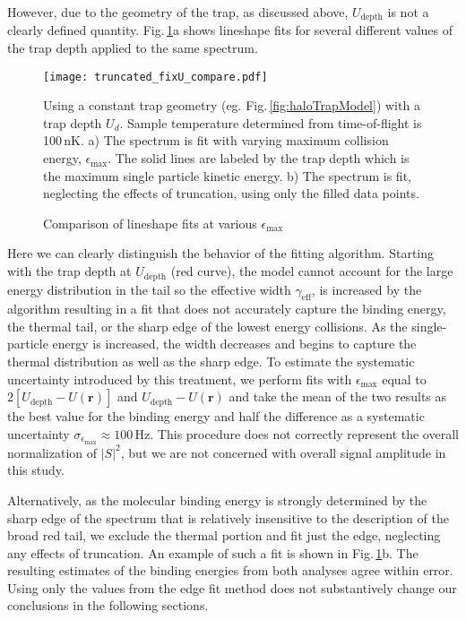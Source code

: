 However, due to the geometry of the trap, as discussed above, $U_\text{depth}$ is not a clearly defined quantity.
Fig.\,\ref{fig:truncatedSpectraFit}a shows lineshape fits for several different values of the trap depth applied to the same spectrum.
	\begin{figure}
	\centerline{
	  \texttt{[image: truncated\_fixU\_compare.pdf]}}
	  \caption{Comparison of lineshape fits at various $\epsilon_{\text{max}}$}{Using a constant trap geometry (eg. Fig.\,\ref{fig:haloTrapModel}) with a trap depth $U_d$. Sample temperature determined from time-of-flight is 100\,nK. a) The spectrum is fit with varying maximum collision energy, $\epsilon_{\text{max}}$. The solid lines are labeled by the trap depth which is the maximum single particle kinetic energy. b) The spectrum is fit, neglecting the effects of truncation, using only the filled data points.}
	  \label{fig:truncatedSpectraFit}
	\end{figure}
Here we can clearly distinguish the behavior of the fitting algorithm.
Starting with the trap depth at $U_\text{depth}$ (red curve), the model cannot account for the large energy distribution in the tail so the effective width $\gamma_{\text{eff}}$, is increased by the algorithm resulting in a fit that does not accurately capture the binding energy, the thermal tail, or the sharp edge of the lowest energy collisions.
As the single-particle energy is increased, the width decreases and begins to capture the thermal distribution as well as the sharp edge.
To estimate the systematic uncertainty introduced by this treatment, we perform fits with $\epsilon_{\text{max}}$ equal to $2[U_{\text{depth}}-U(\mathbf{r})]$ and $U_{\text{depth}}-U(\mathbf{r})$ and take the mean of the two results as the best value for the binding energy and half the difference as a systematic uncertainty $\sigma_{\epsilon_{\text{max}}}\approx 100$\,Hz.
This procedure does not correctly represent the overall normalization of $\vert S \vert^2$, but we are not concerned with overall signal amplitude in this study.

Alternatively, as the molecular binding energy is strongly determined by the sharp edge of the spectrum that is relatively insensitive to the description of the broad red tail, we exclude the thermal portion and fit just the edge, neglecting any effects of truncation.
An example of such a fit is shown in Fig.\,\ref{fig:truncatedSpectraFit}b.
The resulting estimates of the binding energies from both analyses agree within error.
Using only the values from the edge fit method does not substantively change our conclusions in the following sections.

